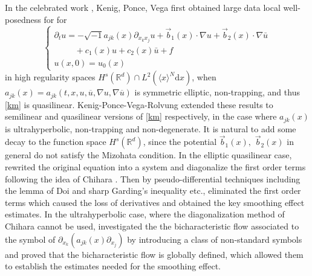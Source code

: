 \documentclass[10pt,twoside,a4paper]{article}
\numberwithin{equation}{section}\allowdisplaybreaks
\begin{document}
 

 In the celebrated work  \cite{kenig2004cauchy}, Kenig, Ponce, Vega first obtained  large data local well-posedness for  for
\begin{equation} \label{km}
 \begin{cases}
		\partial_t u=-\sqrt{-1}  a_{j k}(x) \partial_{x_k x_j} u +\vec{b}_1(x) \cdot \nabla u+\vec{b}_2(x) \cdot \nabla \bar{u} \\
		\qquad~~+c_1(x) u+c_2(x) \bar{u}+f \\
		u(x, 0)=u_0(x)
	\end{cases} 
\end{equation}
in  high regularity spaces $ H^s(\mathbb{R}^d)\cap L^2(\langle x\rangle^N \mathrm{d}x) $, when  $ a_{j k}(x)= a_{j k}(t,x,u,\overline{u},\nabla u,\nabla \overline{u}) $ is symmetric elliptic, non-trapping, and thus \eqref{km}  is quasilinear. Kenig-Ponce-Vega-Rolvung \cite{kenig2005variable,kenig2006general} extended these results to semilinear and quasilinear versions of \eqref{km}  respectively, in the case where $a_{jk}(x)$ is ultrahyperbolic, non-trapping  and non-degenerate.
 It is natural to add some decay to the function space $ H^s(\mathbb{R}^d) $, since the potential $ \vec{b}_1(x),$  $\vec{b}_2(x) $ in general do not satisfy the  Mizohata  condition. In the elliptic quasilinear case,  \cite{kenig2004cauchy} rewrited the original equation into a system and diagonalize the first order terms following the idea of  Chihara \cite{Chihara}. Then by pseudo-differential techniques including the lemma of  Doi \cite{Doi1996Remarks}
and sharp Garding's inequality etc., \cite{kenig2004cauchy} eliminated  the first order terms which caused the loss of derivatives  and obtained the key smoothing effect estimates. In the ultrahyperbolic case, where the diagonalization method of Chihara cannot be used, \cite{kenig2005variable,kenig2006general} investigated the the bicharacteristic flow associated to the symbol of  $ \partial_{x_k}( a_{j k}(x) \partial_{ x_j}) $ by introducing a  class of non-standard symbols and proved
that the bicharacteristic flow is globally defined, which allowed them to establish the estimates needed for the smoothing effect. 
\end{document}
